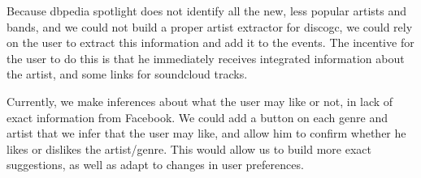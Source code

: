 \documentclass[12pt, a4paper, lithuanian]{article}
\begin{document}
  Because dbpedia spotlight does not identify all the new, less popular artists and bands, and we could not build a proper artist extractor for discogc, we could rely on the user to extract this information and add it to the events. The incentive for the user to do this is that he immediately receives integrated information about the artist, and some links for soundcloud tracks. 

  Currently, we make inferences about what the user may like or not, in lack of exact information from Facebook. We could add a button on each genre and artist that we infer that the user may like, and allow him to confirm whether he likes or dislikes the artist/genre. This would allow us to build more exact suggestions, as well as adapt to changes in user preferences.
\end{document}
